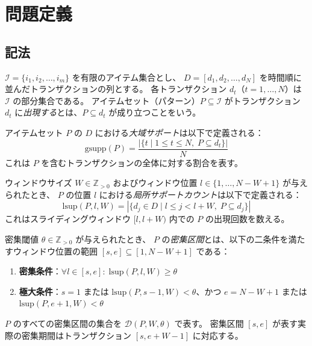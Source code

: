 \section{問題定義}\label{sec:problem}

\subsection{記法}

$\mathcal{I} = \{i_1, i_2, \ldots, i_m\}$ を有限のアイテム集合とし、
$D = [d_1, d_2, \ldots, d_N]$ を時間順に並んだトランザクションの列とする。
各トランザクション $d_t$（$t = 1, \ldots, N$）は $\mathcal{I}$ の部分集合である。
アイテムセット（パターン）$P \subseteq \mathcal{I}$ がトランザクション $d_t$ に\emph{出現する}とは、$P \subseteq d_t$ が成り立つことをいう。

\begin{definition}[大域サポート]\label{def:global_support}
アイテムセット $P$ の $D$ における\emph{大域サポート}は以下で定義される：
\begin{equation}
\text{gsupp}(P) = \frac{|\{t \mid 1 \leq t \leq N,\; P \subseteq d_t\}|}{N}
\label{eq:global_support}
\end{equation}
これは $P$ を含むトランザクションの全体に対する割合を表す。
\end{definition}

\begin{definition}\label{def:local_support}
ウィンドウサイズ $W \in \mathbb{Z}_{>0}$ およびウィンドウ位置 $l \in \{1, \ldots, N - W + 1\}$ が与えられたとき、
$P$ の位置 $l$ における\emph{局所サポートカウント}は以下で定義される：
\begin{equation}
\text{lsup}(P, l, W) = |\{d_j \in D \mid l \leq j < l + W,\; P \subseteq d_j\}|
\label{eq:local_support}
\end{equation}
これはスライディングウィンドウ $[l, l+W)$ 内での $P$ の出現回数を数える。
\end{definition}

\begin{definition}[密集区間]\label{def:dense_interval}
密集閾値 $\theta \in \mathbb{Z}_{>0}$ が与えられたとき、
$P$ の\emph{密集区間}とは、以下の二条件を満たすウィンドウ位置の範囲 $[s, e] \subseteq [1, N-W+1]$ である：
\begin{enumerate}
\item \textbf{密集条件}：$\forall l \in [s, e]: \; \text{lsup}(P, l, W) \geq \theta$
\item \textbf{極大条件}：$s = 1$ または $\text{lsup}(P, s{-}1, W) < \theta$、かつ $e = N{-}W{+}1$ または $\text{lsup}(P, e{+}1, W) < \theta$
\end{enumerate}
$P$ のすべての密集区間の集合を $\mathcal{D}(P, W, \theta)$ で表す。
密集区間 $[s,e]$ が表す実際の密集期間はトランザクション $[s, e+W-1]$ に対応する。
\end{definition}

